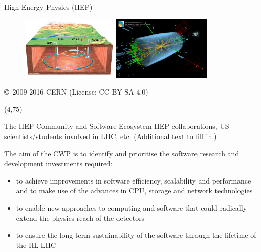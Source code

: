 \documentclass[final]{beamer}
\begin{document}
\begin{frame}{}
\begin{textblock}{38.0}
\begin{block}{High Energy Physics (HEP)}
\begin{figure}[tbph]
\centering
\includegraphics[width=0.41\textwidth]{images/CERN-LHC-cutaway-view-medium.png}
\includegraphics[width=0.42\textwidth]{images/eemm_run195099_evt137440354_ispy_3d-annotated-2.png}
\end{figure}
{\small \copyright~2009-2016 CERN (License: CC-BY-SA-4.0)}
\end{block}
\end{textblock}



\begin{textblock}{38.0}(4,75)
\begin{block}{The HEP Community and Software Ecosystem}
HEP collaborations, US scientists/students involved in LHC, etc. (Additional text to fill in.)

The aim of the CWP is  to identify and prioritise the software research and development investments required:

\begin{itemize}
\item to achieve improvements in software efficiency, scalability and performance and to make use of the advances in CPU, storage and network technologies
\item to enable new approaches to computing and software that could radically extend the physics reach of the detectors
\item to ensure the long term sustainability of the software through the lifetime of the HL-LHC
\end{itemize}



\end{block}
\end{textblock}
\end{frame}
\end{document}
